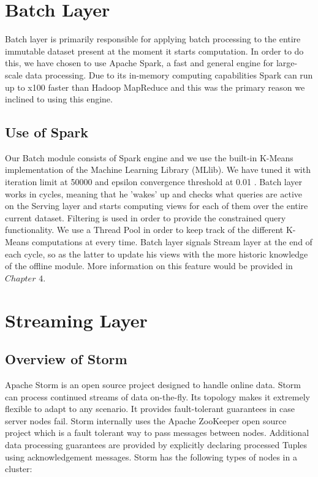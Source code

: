 \documentclass{lmproj}
\begin{document}
\section{Batch Layer}
\label{systemdescr}

Batch layer is primarily responsible for applying batch processing to the entire immutable dataset present at the moment it starts computation. In order to do this, we have chosen to use Apache Spark, a fast and general engine for large-scale data processing. Due to its in-memory computing capabilities Spark can run up to x100 faster than Hadoop MapReduce and this was the primary reason we inclined to using this engine.

\subsection{Use of Spark}

Our Batch module consists of Spark engine and we use the built-in K-Means implementation of the Machine Learning Library (MLlib). We have tuned it with iteration limit at 50000 and epsilon convergence threshold at 0.01 . Batch layer works in cycles, meaning that he 'wakes' up and checks what queries are active on the Serving layer and starts computing views for each of them over the entire current dataset. Filtering is used in order to provide the constrained query functionality. We use a Thread Pool in order to keep track of the different K-Means computations at every time. Batch layer signals Stream layer at the end of each cycle, so as the latter to update his views with the more historic knowledge of the offline module. More information on this feature would be provided in $Chapter$ $4$. 



\section{Streaming Layer}
\label{systemdescr}

\subsection{Overview of Storm}

Apache Storm is an open source project designed to handle online data. Storm can process continued streams of data on-the-fly.  Its topology makes it extremely flexible to adapt to any scenario. It provides fault-tolerant guarantees in case server nodes fail. Storm internally uses the Apache ZooKeeper open source project which is a fault tolerant way to pass messages between nodes. Additional data processing guarantees are provided by explicitly declaring processed Tuples using acknowledgement messages. Storm has the following types of nodes in a cluster:
\end{document}
